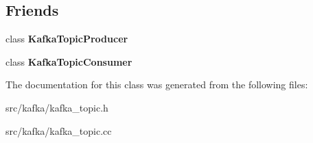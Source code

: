 \subsection*{Friends}
\begin{DoxyCompactItemize}
\item 
class {\bfseries Kafka\+Topic\+Producer}\hypertarget{classlog2hdfs_1_1KafkaTopic_a1e757fe7665a465aface32ef4b483bad}{}\label{classlog2hdfs_1_1KafkaTopic_a1e757fe7665a465aface32ef4b483bad}

\item 
class {\bfseries Kafka\+Topic\+Consumer}\hypertarget{classlog2hdfs_1_1KafkaTopic_a6decdf546e02cbda55f2ef42ac3edc91}{}\label{classlog2hdfs_1_1KafkaTopic_a6decdf546e02cbda55f2ef42ac3edc91}

\end{DoxyCompactItemize}


The documentation for this class was generated from the following files\+:\begin{DoxyCompactItemize}
\item 
src/kafka/kafka\+\_\+topic.\+h\item 
src/kafka/kafka\+\_\+topic.\+cc\end{DoxyCompactItemize}
